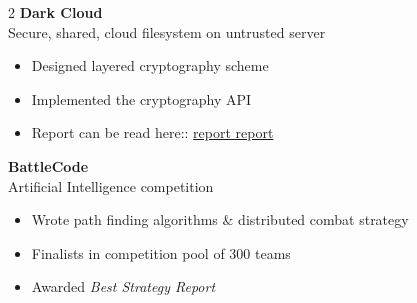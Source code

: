 \documentclass{article}
\newenvironment{changemargin}[2]{%
  \begin{list}{}{%
    \setlength{\topsep}{0pt}%
    \setlength{\leftmargin}{#1}%
    \setlength{\rightmargin}{#2}%
    \setlength{\listparindent}{\parindent}%
    \setlength{\itemindent}{\parindent}%
    \setlength{\parsep}{\parskip}%
  }%
  \item[]}{\end{list}
}
\newenvironment{body} {
	\vspace*{-16pt}
	\begin{changemargin}{-0.25in}{-0.5in}
  }	
	{\end{changemargin}
}
\begin{document}
\begin{body}
\begin{multicols}{2}
		\textbf {Dark Cloud}\\
		Secure, shared, cloud filesystem on untrusted server \\
		\vspace*{-3pt}
		\begin{itemize} \itemsep -2pt
			\item Designed layered cryptography scheme
			\item Implemented the cryptography API
            \item Report can be read here:: \href{https://css.csail.mit.edu/6.858/2013/projects/mpolanco-pcattori-brando90.pdf}{report report}
		\end{itemize}
		\vspace{5pt}
		
		\textbf {BattleCode} \\
		Artificial Intelligence competition\\
		\vspace*{-3pt}
		\begin{itemize} \itemsep -2pt
			\item Wrote path finding algorithms \& distributed combat strategy
			\item Finalists in competition pool of 300 teams
			\item Awarded \emph{Best Strategy Report}
		\end{itemize}
	\end{multicols}
\end{body}


\end{document}
